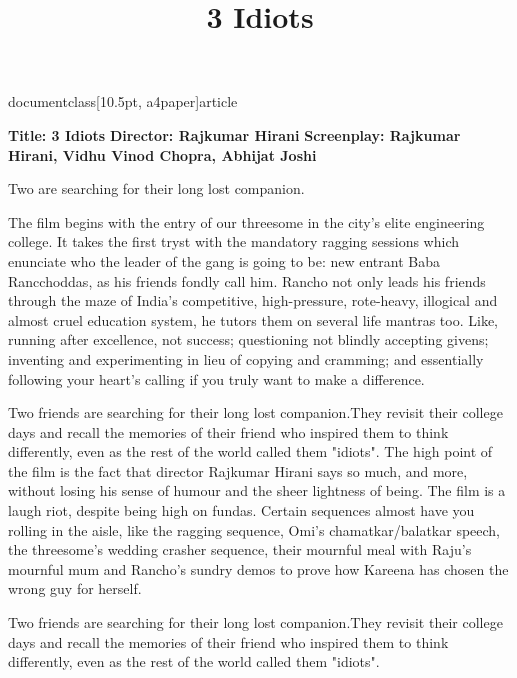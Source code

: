 documentclass[10.5pt, a4paper]{article}
\usepackage{amsfonts}
\usepackage[top=0.3in,left=0.2in,right=0.2in]{geometry}
\usepackage{times}
\usepackage{tabularx}
\title{3 Idiots}

\maketitle
\textbf{Title: 3 Idiots}
\textbf{Director: Rajkumar Hirani}
\textbf{Screenplay: Rajkumar Hirani, Vidhu Vinod Chopra, Abhijat Joshi}

Two  are searching for their long lost companion.

The film begins with the entry of our threesome in the city's elite engineering college.
 It takes the first tryst with the mandatory ragging sessions which enunciate who the leader
 of the gang is going to be: new entrant Baba Rancchoddas, as his friends fondly call him. Rancho not only leads
 his friends through the maze of India's competitive, high-pressure, rote-heavy, illogical and almost cruel
 education system, he tutors them on several life mantras too. Like, running after excellence, not success;
 questioning not blindly accepting givens; inventing and experimenting in lieu of copying and cramming;
 and essentially following your heart's calling if you truly want to make
 a difference.

Two friends are searching for their long lost companion.They revisit their college days 
and recall the memories of their friend who inspired them to think differently, 
even as the rest of the world called them "idiots". 
The high point of the film is the fact that director Rajkumar Hirani says so much, and more, without losing his sense of humour and the sheer lightness of being. The film is a laugh riot, despite being high on fundas. Certain sequences almost have you rolling in the aisle, like the ragging sequence, Omi's chamatkar/balatkar speech, the threesome's wedding crasher sequence, their mournful meal with Raju's mournful mum and Rancho's sundry demos to prove how Kareena has chosen the wrong guy for herself.

Two friends are searching for their long lost companion.They revisit their college days 
and recall the memories of their friend who inspired them to think differently, 
even as the rest of the world called them "idiots". 


